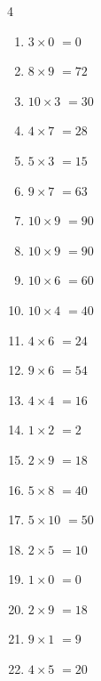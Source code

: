 \begin{multicols}{4}
\begin{enumerate}
  \item $3\times 0$
        $=0$

  \item $8\times 9$
        $=72$

  \item $10\times 3$
        $=30$

  \item $4\times 7$
        $=28$

  \item $5\times 3$
        $=15$

  \item $9\times 7$
        $=63$

\columnbreak %

\resetques

  \item $10\times 9$
        $=90$

  \item $10\times 9$
        $=90$

  \item $10\times 6$
        $=60$

  \item $10\times 4$
        $=40$

  \item $4\times 6$
        $=24$

  \item $9\times 6$
        $=54$

  \item $4\times 4$
        $=16$

  \item $1\times 2$
        $=2$

  \item $2\times 9$
        $=18$

  \item $5\times 8$
        $=40$

  \item $5\times 10$
        $=50$

  \item $2\times 5$
        $=10$

  \item $1\times 0$
        $=0$

  \item $2\times 9$
        $=18$

  \item $9\times 1$
        $=9$

  \item $4\times 5$
        $=20$


\end{enumerate}
\end{multicols}
